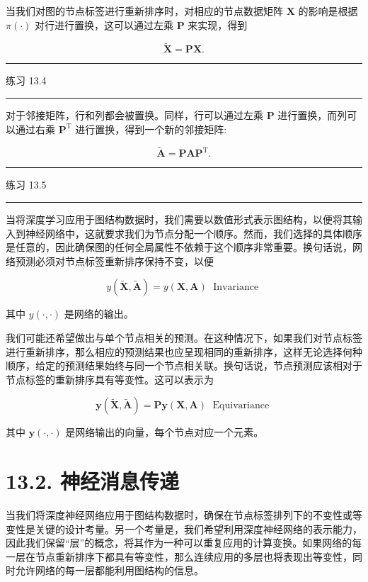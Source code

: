 \documentclass[10pt]{report}
\newcommand{\HRule}{\begin{center}\rule{0.9\linewidth}{0.2mm}\end{center}}
\begin{document}
当我们对图的节点标签进行重新排序时，对相应的节点数据矩阵 \(\mathbf{X}\) 的影响是根据 \(\pi \left( \cdot \right)\) 对行进行置换，这可以通过左乘 \(\mathbf{P}\) 来实现，得到

\[
\widetilde{\mathbf{X}} = \mathbf{{PX}}. \tag{13.4}
\]

\HRule

练习 13.4

\HRule

对于邻接矩阵，行和列都会被置换。同样，行可以通过左乘 \(\mathbf{P}\) 进行置换，而列可以通过右乘 \({\mathbf{P}}^{\mathrm{T}}\) 进行置换，得到一个新的邻接矩阵:

\[
\widetilde{\mathbf{A}} = {\mathbf{{PAP}}}^{\mathrm{T}}. \tag{13.5}
\]

\HRule

练习 13.5

\HRule

当将深度学习应用于图结构数据时，我们需要以数值形式表示图结构，以便将其输入到神经网络中，这就要求我们为节点分配一个顺序。然而，我们选择的具体顺序是任意的，因此确保图的任何全局属性不依赖于这个顺序非常重要。换句话说，网络预测必须对节点标签重新排序保持不变，以便

\[
y\left( {\widetilde{\mathbf{X}},\widetilde{\mathbf{A}}}\right)  = y\left( {\mathbf{X},\mathbf{A}}\right) \;\text{ Invariance } \tag{13.6}
\]

其中 \(y\left( {\cdot , \cdot  }\right)\) 是网络的输出。

我们可能还希望做出与单个节点相关的预测。在这种情况下，如果我们对节点标签进行重新排序，那么相应的预测结果也应呈现相同的重新排序，这样无论选择何种顺序，给定的预测结果始终与同一个节点相关联。换句话说，节点预测应该相对于节点标签的重新排序具有等变性。这可以表示为

\[
\mathbf{y}\left( {\widetilde{\mathbf{X}},\widetilde{\mathbf{A}}}\right)  = \mathbf{P}\mathbf{y}\left( {\mathbf{X},\mathbf{A}}\right) \;\text{ Equivariance } \tag{13.7}
\]

其中 \(\mathbf{y}\left( {\cdot , \cdot  }\right)\) 是网络输出的向量，每个节点对应一个元素。

\section*{13.2. 神经消息传递}

当我们将深度神经网络应用于图结构数据时，确保在节点标签排列下的不变性或等变性是关键的设计考量。另一个考量是，我们希望利用深度神经网络的表示能力，因此我们保留“层”的概念，将其作为一种可以重复应用的计算变换。如果网络的每一层在节点重新排序下都具有等变性，那么连续应用的多层也将表现出等变性，同时允许网络的每一层都能利用图结构的信息。
\end{document}
